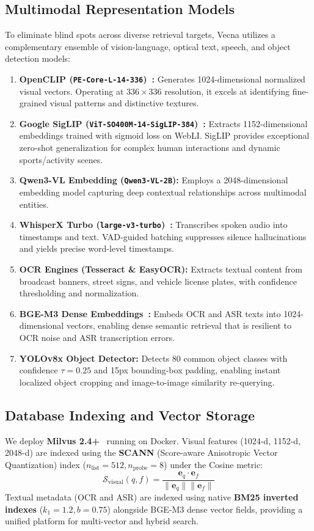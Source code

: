 \documentclass[10pt,a4paper,twocolumn]{article}
\begin{document}
\subsection{Multimodal Representation Models}
To eliminate blind spots across diverse retrieval targets, Vecna utilizes a complementary ensemble of vision-language, optical text, speech, and object detection models:
\begin{enumerate}
    \item \textbf{OpenCLIP (\texttt{PE-Core-L-14-336})~\cite{radford2021learning}:} Generates 1024-dimensional normalized visual vectors. Operating at $336\times336$ resolution, it excels at identifying fine-grained visual patterns and distinctive textures.
    \item \textbf{Google SigLIP (\texttt{ViT-SO400M-14-SigLIP-384})~\cite{zhai2023sigmoid}:} Extracts 1152-dimensional embeddings trained with sigmoid loss on WebLI. SigLIP provides exceptional zero-shot generalization for complex human interactions and dynamic sports/activity scenes.
    \item \textbf{Qwen3-VL Embedding (\texttt{Qwen3-VL-2B}):} Employs a 2048-dimensional embedding model capturing deep contextual relationships across multimodal entities.
    \item \textbf{WhisperX Turbo (\texttt{large-v3-turbo})~\cite{bain2023whisperx}:} Transcribes spoken audio into timestamps and text. VAD-guided batching suppresses silence hallucinations and yields precise word-level timestamps.
    \item \textbf{OCR Engines (Tesseract \& EasyOCR):} Extracts textual content from broadcast banners, street signs, and vehicle license plates, with confidence thresholding and normalization.
    \item \textbf{BGE-M3 Dense Embeddings~\cite{chen2024bge}:} Embeds OCR and ASR texts into 1024-dimensional vectors, enabling dense semantic retrieval that is resilient to OCR noise and ASR transcription errors.
    \item \textbf{YOLOv8x Object Detector:} Detects 80 common object classes with confidence $\tau = 0.25$ and 15px bounding-box padding, enabling instant localized object cropping and image-to-image similarity re-querying.
\end{enumerate}

\subsection{Database Indexing and Vector Storage}
We deploy \textbf{Milvus 2.4+}~\cite{milvus2021} running on Docker. Visual features (1024-d, 1152-d, 2048-d) are indexed using the \textbf{SCANN} (Score-aware Anisotropic Vector Quantization) index ($n_{\text{list}} = 512, n_{\text{probe}} = 8$) under the Cosine metric:
\begin{equation}
\mathcal{S}_{\text{visual}}(q, f) = \frac{\mathbf{e}_q \cdot \mathbf{e}_f}{\|\mathbf{e}_q\| \|\mathbf{e}_f\|}
\end{equation}
Textual metadata (OCR and ASR) are indexed using native \textbf{BM25 inverted indexes} ($k_1 = 1.2, b = 0.75$) alongside BGE-M3 dense vector fields, providing a unified platform for multi-vector and hybrid search.
\end{document}

